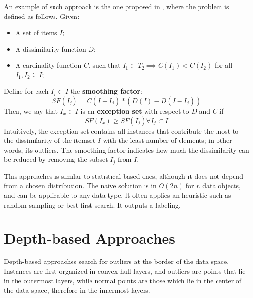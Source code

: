 An example of such approach is the one proposed in \cite{arning1996linear}, where the problem is defined as follows. Given:
\begin{itemize}
    \item A set of items $I$;
    \item A dissimilarity function $D$;
    \item A cardinality function $C$, such that $I_1 \subset T_2 \implies C(I_1) < C(I_2)$ for all $I_1, I_2 \subseteq I$;
\end{itemize}
Define for each $I_j \subset I$ the \textbf{smoothing factor}:
\begin{equation*}
    SF(I_j) = C(I-I_j) * (D(I) - D(I-I_j))
\end{equation*}
Then, we say that $I_x \subset I$ is an \textbf{exception set} with respect to $D$ and $C$ if
\begin{equation*}
    SF(I_x) \geq SF(I_j) \forall I_j \subset I
\end{equation*}
Intuitively, the exception set contains all instances that contribute the most to the dissimilarity of the itemset $I$ with the least number of elements; in other words, its outliers. The smoothing factor indicates how much the dissimilarity can be reduced by removing the subset $I_j$ from $I$. 

This approaches is similar to statistical-based ones, although it does not depend from a chosen distribution. The naive solution is in $O(2n)$ for $n$ data objects, and can be applicable to any data type. It often applies an heuristic such as random sampling or best first search. It outputs a labeling.

\section{Depth-based Approaches}

Depth-based approaches search for outliers at the border of the data space. Instances are first organized in convex hull layers, and outliers are points that lie in the outermost layers, while normal points are those which lie in the center of the data space, therefore in the innermost layers.

